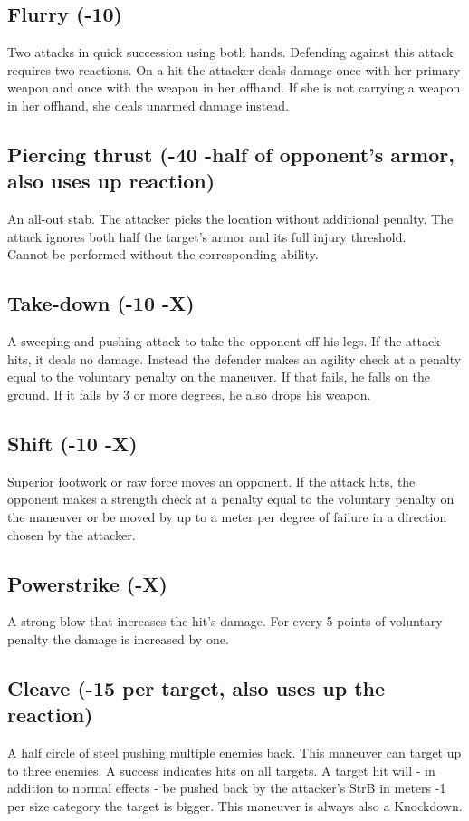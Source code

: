 \subsection*{Flurry (-10)}
Two attacks in quick succession using both hands. Defending against this attack requires two reactions. On a hit the attacker deals damage once with her primary weapon and once with the weapon in her offhand. If she is not carrying a weapon in her offhand, she deals unarmed damage instead. 
\subsection*{Piercing thrust (-40 -half of opponent’s armor, also uses up reaction)}
An all-out stab. The attacker picks the location without additional penalty. The attack ignores both half the target's armor and its full injury threshold.\\
Cannot be performed without the corresponding ability.
\subsection*{Take-down (-10 -X)}
A sweeping and pushing attack to take the opponent off his legs. If the attack hits, it deals no damage. Instead the defender makes an agility check at a penalty equal to the voluntary penalty on the maneuver. If that fails, he falls on the ground. If it fails by 3 or more degrees, he also drops his weapon.
\subsection*{Shift (-10 -X)}
Superior footwork or raw force moves an opponent. If the attack hits, the opponent makes a strength check at a penalty equal to the voluntary penalty on the maneuver or be moved by up to a meter per degree of failure in a direction chosen by the attacker.
\subsection*{Powerstrike (-X)}
A strong blow that increases the hit’s damage. For every 5 points of voluntary penalty the damage is increased by one.
\subsection*{Cleave (-15 per target, also uses up the reaction)}
A half circle of steel pushing multiple enemies back. This maneuver can target up to three enemies. A success indicates hits on all targets. A target hit will - in addition to normal effects - be pushed back by the attacker’s StrB in meters -1 per size category the target is bigger. This maneuver is always also a Knockdown.
